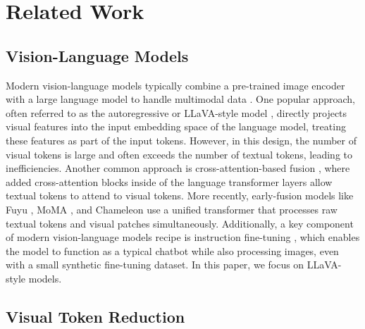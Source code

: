 \documentclass{article} %
\begin{document}
\section{Related Work}
\subsection{Vision-Language Models}

Modern vision-language models typically combine a pre-trained image encoder with a large language model to handle multimodal data \citep{li2023blip}. One popular approach, often referred to as the autoregressive or LLaVA-style model \citep{li2023blip, liu2024visual}, directly projects visual features into the input embedding space of the language model, treating these features as part of the input tokens. However, in this design, the number of visual tokens is large and often exceeds the number of textual tokens, leading to inefficiencies. Another common approach is cross-attention-based fusion \citep{alayrac2022flamingo}, where added cross-attention blocks inside of the language transformer layers allow textual tokens to attend to visual tokens. More recently, early-fusion models like Fuyu \citep{fuyu-8b}, MoMA \citep{lin2024moma}, and Chameleon \citep{team2024chameleon} use a unified transformer that processes raw textual tokens and visual patches simultaneously. Additionally, a key component of modern vision-language models recipe is instruction fine-tuning \citep{Dai2023InstructBLIPTG, zhu2023minigpt, liu2024improved, liu2024visual, singla2024pixels}, which enables the model to function as a typical chatbot while also processing images, even with a small synthetic fine-tuning dataset. In this paper, we focus on LLaVA-style models.

\subsection{Visual Token Reduction}
\end{document}
